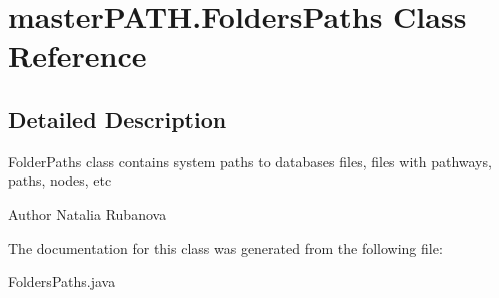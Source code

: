 \section{master\+P\+A\+T\+H.\+Folders\+Paths Class Reference}
\label{classmaster_p_a_t_h_1_1_folders_paths}


\subsection{Detailed Description}
Folder\+Paths class contains system paths to databases files, files with pathways, paths, nodes, etc

\begin{DoxyAuthor}{Author}
Natalia Rubanova 
\end{DoxyAuthor}


The documentation for this class was generated from the following file\+:\begin{DoxyCompactItemize}
\item 
Folders\+Paths.\+java\end{DoxyCompactItemize}

